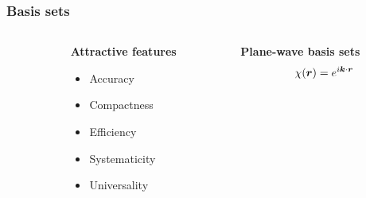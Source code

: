 \begin{frame}
    \frametitle{Basis sets}
    \begin{columns}
    \begin{column}{.10\textwidth}
    \end{column}
    \begin{column}{.30\textwidth}
    \textbf{Attractive features}
    \begin{itemize}
        \item {\color{yellow} Accuracy}
        \item {\color{yellow} Compactness}
        \item {\color{green} Efficiency}
        \item {\color{green} Systematicity}
        \item {\color{yellow} Universality}
    \end{itemize}
    \end{column}
    \begin{column}{.60\textwidth}
    \centering
    \textbf{Plane-wave basis sets}
    \begin{equation}
        \nonumber
        \chi(\boldsymbol r) = e^{i\boldsymbol k\cdot\boldsymbol r}
    \end{equation}
    

    \end{column}
    \end{columns}    

    \vspace{5mm}


\end{frame}
